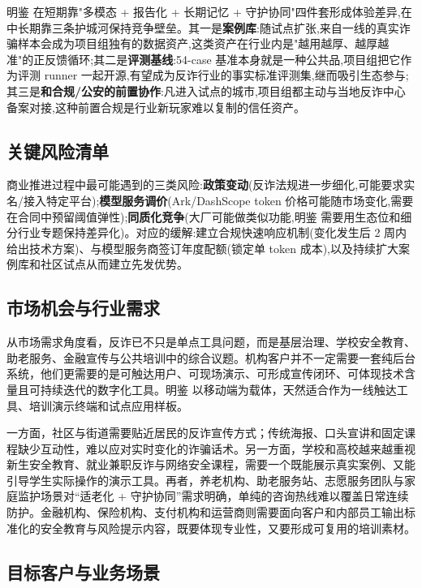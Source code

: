 \documentclass[UTF8,a4paper,12pt]{ctexart}
\begin{document}
明鉴 在短期靠"多模态 + 报告化 + 长期记忆 + 守护协同"四件套形成体验差异,在中长期靠三条护城河保持竞争壁垒。其一是\textbf{案例库}:随试点扩张,来自一线的真实诈骗样本会成为项目组独有的数据资产,这类资产在行业内是"越用越厚、越厚越准"的正反馈循环;其二是\textbf{评测基线}:54-case 基准本身就是一种公共品,项目组把它作为评测 runner 一起开源,有望成为反诈行业的事实标准评测集,继而吸引生态参与;其三是\textbf{和合规/公安的前置协作}:凡进入试点的城市,项目组都主动与当地反诈中心备案对接,这种前置合规是行业新玩家难以复制的信任资产。

\subsection{关键风险清单}

商业推进过程中最可能遇到的三类风险:\textbf{政策变动}(反诈法规进一步细化,可能要求实名/接入特定平台);\textbf{模型服务调价}(Ark/DashScope token 价格可能随市场变化,需要在合同中预留阈值弹性);\textbf{同质化竞争}(大厂可能做类似功能,明鉴 需要用生态位和细分行业专题保持差异化)。对应的缓解:建立合规快速响应机制(变化发生后 2 周内给出技术方案)、与模型服务商签订年度配额(锁定单 token 成本),以及持续扩大案例库和社区试点从而建立先发优势。

\subsection{市场机会与行业需求}

从市场需求角度看，反诈已不只是单点工具问题，而是基层治理、学校安全教育、助老服务、金融宣传与公共培训中的综合议题。机构客户并不一定需要一套纯后台系统，他们更需要的是可触达用户、可现场演示、可形成宣传闭环、可体现技术含量且可持续迭代的数字化工具。明鉴 以移动端为载体，天然适合作为一线触达工具、培训演示终端和试点应用样板。

一方面，社区与街道需要贴近居民的反诈宣传方式；传统海报、口头宣讲和固定课程缺少互动性，难以应对实时变化的诈骗话术。另一方面，学校和高校越来越重视新生安全教育、就业兼职反诈与网络安全课程，需要一个既能展示真实案例、又能引导学生实际操作的演示工具。再者，养老机构、助老服务站、志愿服务团队与家庭监护场景对“适老化 + 守护协同”需求明确，单纯的咨询热线难以覆盖日常连续防护。金融机构、保险机构、支付机构和运营商则需要面向客户和内部员工输出标准化的安全教育与风险提示内容，既要体现专业性，又要形成可复用的培训素材。

\subsection{目标客户与业务场景}
\end{document}

